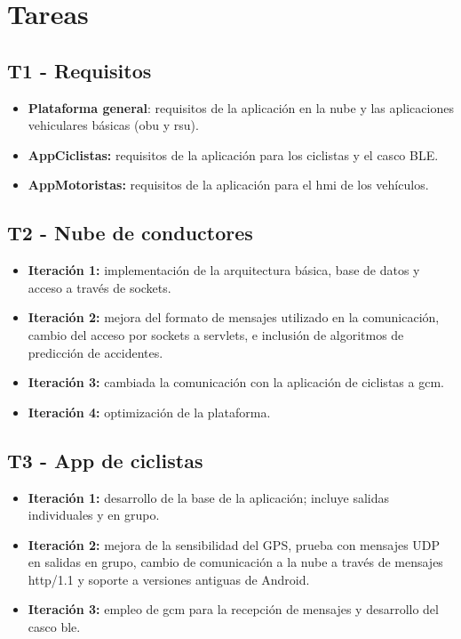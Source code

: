 \section{Tareas}
\subsection{T1 - Requisitos}
\begin{itemize}
	\item \textbf{Plataforma general}: requisitos de la aplicación en la nube y las aplicaciones vehiculares
	básicas (\gls{obu} y \gls{rsu}).

	\item \textbf{AppCiclistas:} requisitos de la aplicación para los ciclistas y el casco BLE.

	\item \textbf{AppMotoristas:} requisitos de la aplicación para el \gls{hmi} de los vehículos.
\end{itemize}

\subsection{T2 - Nube de conductores}
\begin{itemize}
	\item \textbf{Iteración 1:} implementación de la arquitectura básica, base de datos y acceso a través de sockets.

	\item \textbf{Iteración 2:} mejora del formato de mensajes utilizado en la comunicación, cambio del acceso por
	sockets a servlets, e inclusión de algoritmos de predicción de accidentes.

	\item \textbf{Iteración 3:} cambiada la comunicación con la aplicación de ciclistas a \gls{gcm}.

	\item \textbf{Iteración 4:} optimización de la plataforma.
\end{itemize}

\subsection{T3 - App de ciclistas}
\begin{itemize}
	\item \textbf{Iteración 1:} desarrollo de la base de la aplicación; incluye salidas individuales y en grupo.

	\item \textbf{Iteración 2:} mejora de la sensibilidad del GPS, prueba con mensajes UDP en salidas en grupo,
	cambio de comunicación a la nube a través de mensajes \Gls{http/1.1} y soporte a versiones antiguas de Android.

	\item \textbf{Iteración 3:} empleo de \gls{gcm} para la recepción de mensajes y desarrollo del casco \gls{ble}.
\end{itemize}

